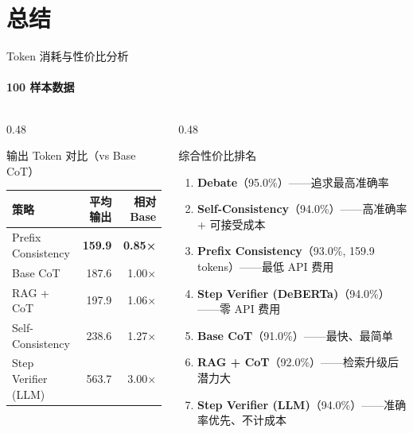 \documentclass[10pt,aspectratio=169]{beamer}
\newcommand{\tightitems}{\setlength{\itemsep}{0.24em}}
\begin{document}
\section{总结}

\begin{frame}{Token 消耗与性价比分析}
  \framesubtitle{100 样本数据}
  \small
  \begin{columns}[T,onlytextwidth]
    \begin{column}{0.48\textwidth}
      \begin{block}{输出 Token 对比（vs Base CoT）}
        \begin{tabular}{lrr}
          \toprule
          策略 & 平均输出 & 相对 Base \\
          \midrule
          Prefix Consistency & \textbf{159.9} & \textbf{0.85×} \\
          Base CoT & 187.6 & 1.00× \\
          RAG + CoT & 197.9 & 1.06× \\
          Self-Consistency & 238.6 & 1.27× \\
          Step Verifier (LLM) & 563.7 & 3.00× \\
          \bottomrule
        \end{tabular}
      \end{block}
    \end{column}
    \begin{column}{0.48\textwidth}
      \begin{block}{综合性价比排名}
        \begin{enumerate}
          \tightitems
          \item \textbf{Debate}（95.0\%）——追求最高准确率
          \item \textbf{Self-Consistency}（94.0\%）——高准确率 + 可接受成本
          \item \textbf{Prefix Consistency}（93.0\%, 159.9 tokens）——最低 API 费用
          \item \textbf{Step Verifier (DeBERTa)}（94.0\%）——零 API 费用
          \item \textbf{Base CoT}（91.0\%）——最快、最简单
          \item \textbf{RAG + CoT}（92.0\%）——检索升级后潜力大
          \item \textbf{Step Verifier (LLM)}（94.0\%）——准确率优先、不计成本
        \end{enumerate}
      \end{block}
    \end{column}
  \end{columns}
\end{frame}
\end{document}
